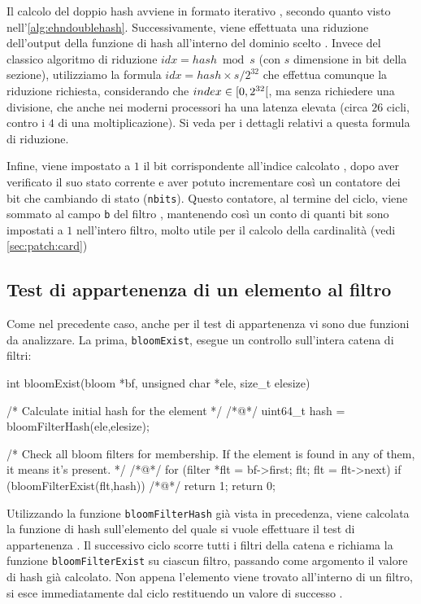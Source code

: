 Il calcolo del doppio hash avviene in formato iterativo , secondo quanto visto
nell'\autoref{alg:ehndoublehash}. Successivamente, viene effettuata una riduzione dell'output della
funzione di hash all'interno del dominio scelto . Invece del classico algoritmo di
riduzione $idx = hash \bmod s$ (con $s$ dimensione in bit della sezione), utilizziamo la formula
$idx = hash \times s / 2^{32}$ che effettua comunque la riduzione richiesta, considerando che $index
\in \interval[open right]{0}{2^{32}}$, ma senza richiedere una divisione, che anche nei moderni
processori ha una latenza elevata (circa $26$ cicli, contro i $4$ di una moltiplicazione). Si veda
\cite{lemire-reduction} per i dettagli relativi a questa formula di riduzione.

Infine, viene impostato a $1$ il bit corrispondente all'indice calcolato , dopo aver
verificato il suo stato corrente e aver potuto incrementare così un contatore dei bit che cambiando
di stato (\verb|nbits|). Questo contatore, al termine del ciclo, viene sommato al campo \verb|b|
del filtro , mantenendo così un conto di quanti bit sono impostati a $1$ nell'intero
filtro, molto utile per il calcolo della cardinalità (vedi \autoref{sec:patch:card})


\subsection{Test di appartenenza di un elemento al filtro}

Come nel precedente caso, anche per il test di appartenenza vi sono due funzioni da analizzare.
La prima, \verb|bloomExist|, esegue un controllo sull'intera catena di filtri:

\begin{commentedsource}[style=csource,caption=Test di appartenenza di un elemento,label={lst:bloomExist}]
int bloomExist(bloom *bf, unsigned char *ele, size_t elesize) {
    /* Calculate initial hash for the element */
/*@\lnote@*/    uint64_t hash = bloomFilterHash(ele,elesize);

    /* Check all bloom filters for membership. If the element is
       found in any of them, it means it's present. */
/*@\lnote@*/    for (filter *flt = bf->first; flt; flt = flt->next)
        if (bloomFilterExist(flt,hash))
/*@\lnote@*/            return 1;
    return 0;
}
\end{commentedsource}

Utilizzando la funzione \verb|bloomFilterHash| già vista in precedenza, viene calcolata la funzione
di hash sull'elemento del quale si vuole effettuare il test di appartenenza . Il successivo
ciclo  scorre tutti i filtri della catena e richiama la funzione \verb|bloomFilterExist|
su ciascun filtro, passando come argomento il valore di hash già calcolato. Non appena l'elemento
viene trovato all'interno di un filtro, si esce immediatamente dal ciclo restituendo un valore di
successo .


